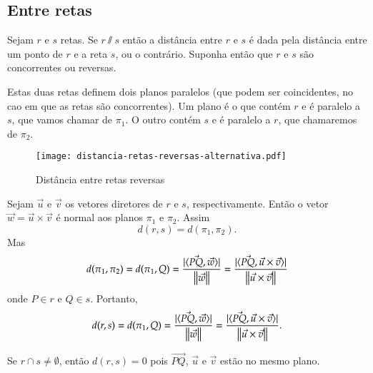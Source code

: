 
\subsection{Entre retas} %
\label{sub:entre_retas}

Sejam $r$ e $s$ retas. Se $r \varparallel s$ ent\~ao a dist\^ancia entre $r$ e $s$ \'e dada pela dist\^ancia entre um ponto de $r$ e a reta $s$, ou o contr\'ario. Suponha ent\~ao que $r$ e $s$ s\~ao concorrentes ou reversas. %

Estas duas retas definem dois planos paralelos (que podem ser coincidentes, no cao em que as retas s\~ao concorrentes). Um plano \'e o que cont\'em $r$ e \'e paralelo a $s$, que vamos chamar de $\pi_1$. O outro cont\'em $s$ e \'e paralelo a $r$, que chamaremos de $\pi_2$.

\begin{figure}[!h]
    \centering
    \caption{Dist\^ancia entre retas reversas}
    \texttt{[image: distancia-retas-reversas-alternativa.pdf]}
\end{figure}

Sejam $\vec{u}$ e $\vec{v}$ os vetores diretores de $r$ e $s$, respectivamente. Ent\~ao o vetor $\vec{w} = \vec{u}\times\vec{v}$ \'e normal aos planos $\pi_1$ e $\pi_2$. Assim
\[
    d(r,s) = d(\pi_1,\pi_2).
\]
Mas
\[
    d(\pi_1,\pi_2) = d(\pi_1, Q) = \dfrac{|\langle\vec{PQ},\vec{w}\rangle|}{\left\Vert{\vec{w}}\right\Vert} = \dfrac{|\langle\vec{PQ},\vec{u}\times\vec{v}\rangle|}{\left\Vert{\vec{u}\times\vec{v}}\right\Vert}
\]
onde $P \in r$ e $Q \in s$. Portanto,
\[
    d(r,s) = d(\pi_1, Q) = \dfrac{|\langle\vec{PQ},\vec{w}\rangle|}{\left\Vert{\vec{w}}\right\Vert} = \dfrac{|\langle\vec{PQ},\vec{u}\times\vec{v}\rangle|}{\left\Vert{\vec{u}\times\vec{v}}\right\Vert}.
\]

Se $r \cap s \ne \emptyset$, ent\~ao $d(r,s) = 0$ pois $\vec{PQ}$, $\vec{u}$ e $\vec{v}$ est\~ao no mesmo plano.


